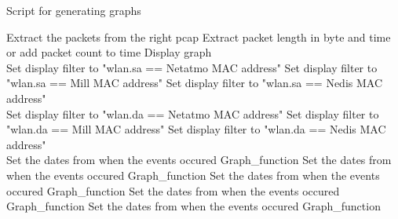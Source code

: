 \begin{algorithm}
\caption{Script for generating graphs}\label{alg:GraphScript}
\begin{algorithmic}
         
            \State Extract the packets from the right pcap
                \State Extract packet length in byte and time or add packet count to time
                \State Display graph
            \EndFor
        \EndFor {}\\
     
            \State Set display filter to "wlan.sa == Netatmo MAC address"
            \State Set display filter to "wlan.sa == Mill MAC address"
            \State Set display filter to "wlan.sa == Nedis MAC address"    
        \EndIf\\
     
            \State Set display filter to "wlan.da == Netatmo MAC address"
            \State Set display filter to "wlan.da == Mill MAC address"
            \State Set display filter to "wlan.da == Nedis MAC address"  
        \EndIf\\
     
        \State Set the dates from when the events occured 
        \State Graph\_function
        \State Set the dates from when the events occured 
        \State Graph\_function
        \State Set the dates from when the events occured 
        \State Graph\_function
        \State Set the dates from when the events occured 
        \State Graph\_function
        \State Set the dates from when the events occured 
        \State Graph\_function
    \EndIf {}
\end{algorithmic}
\end{algorithm}

